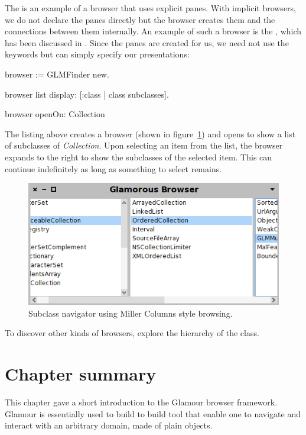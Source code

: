 \documentclass[a4paper,10pt,twoside]{book}
\begin{document}
The  is an example of a browser that uses explicit
panes. With implicit browsers, we do not declare the panes directly
but the browser creates them and the connections between them
internally. An example of such a browser is the , which has
been discussed in . Since the panes are
created for us, we need not use the  keywords but can
simply specify our presentations:

\begin{code}{}
browser := GLMFinder new.

browser list
  display: [:class | class subclasses].

browser openOn: Collection
\end{code}

The listing above creates a browser (shown in figure~\ref{fig:finder})
and opens to show a list of subclasses of \emph{Collection}. Upon
selecting an item from the list, the browser expands to the right to
show the subclasses of the selected item. This can continue
indefinitely as long as something to select remains.

\begin{figure}[htbp]
\centerline{\includegraphics[width=\linewidth]{finder.png}}
\caption{Subclass navigator using Miller Columns style browsing.}
\label{fig:finder}
\end{figure}

To discover other kinds of browsers, explore the hierarchy of the
 class.

\section{Chapter summary}

This chapter gave a short introduction to the Glamour browser framework. Glamour is essentially used to build to build tool that enable one to navigate and interact with an arbitrary domain, made of plain objects.
\end{document}
